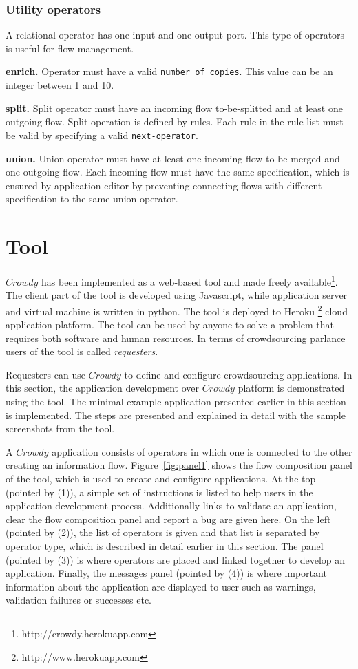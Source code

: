 \subsubsection{Utility operators}
A relational operator has one input and one output port. This type of operators is useful for 
flow management.

\textbf{enrich.}
Operator must have a valid \texttt{number of copies}. This value can be an integer between 
1 and 10.

\textbf{split.}
Split operator must have an incoming flow to-be-splitted and at least one outgoing flow. 
Split operation is defined by rules. Each rule in the rule list must be valid by specifying 
a valid \texttt{next-operator}.

\textbf{union.}
Union operator must have at least one incoming flow to-be-merged and one outgoing flow. 
Each incoming flow must have the same specification, which is ensured by application editor 
by preventing connecting flows with different specification to the same union operator.


\section{Tool}
\label{sec:tool}
$Crowdy$ has been implemented as a web-based tool and made freely 
available\footnote{http://crowdy.herokuapp.com}. The 
client part of the tool is developed using Javascript, while application server and 
virtual machine is written in python. The tool is deployed to Heroku 
\footnote{http://www.herokuapp.com} cloud application 
platform. The tool can be used by anyone to solve a problem that requires both 
software and human resources. In terms of crowdsourcing parlance users of the tool 
is called \textit{requesters}.

Requesters can use $Crowdy$ to define and configure crowdsourcing applications. 
In this section, the application development over $Crowdy$ platform is 
demonstrated using the tool. The minimal example application presented earlier 
in this section is implemented. The steps are presented and explained in detail 
with the sample screenshots from the tool.

A $Crowdy$ application consists of operators in which one is connected to the other creating 
an information flow. Figure~\ref{fig:panel1} shows the flow composition panel of the tool, which 
is used to create and configure applications. At the top (pointed by (1)), a simple set of 
instructions is listed to help users in the application development process. Additionally links 
to validate an application, clear the flow composition panel and report a bug are given here. 
On the left (pointed by (2)), the list of operators is given and that list is separated by operator 
type, which is described in detail earlier in this section. The panel (pointed by (3)) is where 
operators are placed and linked together to develop an application. Finally, the messages 
panel (pointed by (4)) is where important information about the application are displayed to 
user such as warnings, validation failures or successes etc.

